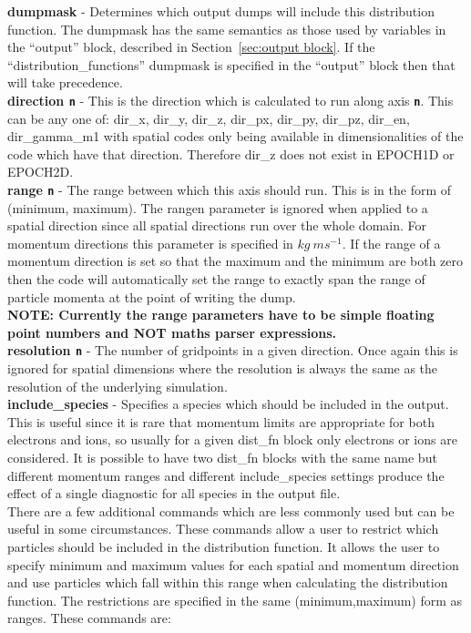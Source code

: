 \documentclass[12pt,a4paper]{article}
\newcommand{\emphtext}{\color{warwickdark} \fontfamily{phv}\selectfont\large\bf}
\newcommand{\inlinecode}[1]{{\color{warwickred} \bf\texttt{#1}}}
\newcommand{\sect}[1]{Section~\ref{sec:#1}}
\begin{document}
{\emphtext dumpmask} - Determines which output dumps will include this
distribution function. The dumpmask has the same semantics as those used
by variables in the ``output'' block, described in \sect{output block}.
If the ``distribution\_functions'' dumpmask is specified in the ``output''
block then that will take precedence.\\

{\emphtext direction\inlinecode{n}} - This is the direction
which is calculated to run along axis \inlinecode{n}. This can be any one of:
dir\_x, dir\_y, dir\_z, dir\_px, dir\_py, dir\_pz, dir\_en, dir\_gamma\_m1
with spatial codes only being available in dimensionalities of the code which
have that direction. Therefore dir\_z does not exist in EPOCH1D or EPOCH2D.\\

{\emphtext range\inlinecode{n}} - The range between which this axis should
run. This is in the form of (minimum, maximum). The rangen parameter is ignored
when applied to a spatial direction since all spatial directions run over
the whole domain. For momentum directions this parameter is specified in
$kg\ ms^{-1}$. If the range of a momentum direction is set so that the maximum
and the minimum are both zero then the code will automatically set the range to
exactly span the range of particle momenta at the point of writing the dump.\\

{\emphtext NOTE: Currently the range parameters have to be simple floating
point numbers and NOT maths parser expressions.}\\

{\emphtext resolution\inlinecode{n}} - The number of gridpoints in a given
direction. Once again this is ignored for spatial dimensions where the
resolution is always the same as the resolution of the underlying simulation.\\

{\emphtext include\_species} - Specifies a species which should be included
in the output. This is useful since it is rare that momentum limits are
appropriate for both electrons and ions, so usually for a given dist\_fn block
only electrons or ions are considered. It is possible to have two dist\_fn
blocks with the same name but different momentum ranges and different
include\_species settings produce the effect of a single diagnostic for
all species in the output file.\\


There are a few additional commands which are less commonly used but can be
useful in some circumstances. These commands allow a user to restrict which
particles should be included in the distribution function.
It allows the user to specify minimum and
maximum values for each spatial and momentum direction and use particles which
fall within this range when calculating the distribution function. The
restrictions are specified in the same (minimum,maximum) form as ranges. These
commands are:\\
\end{document}
